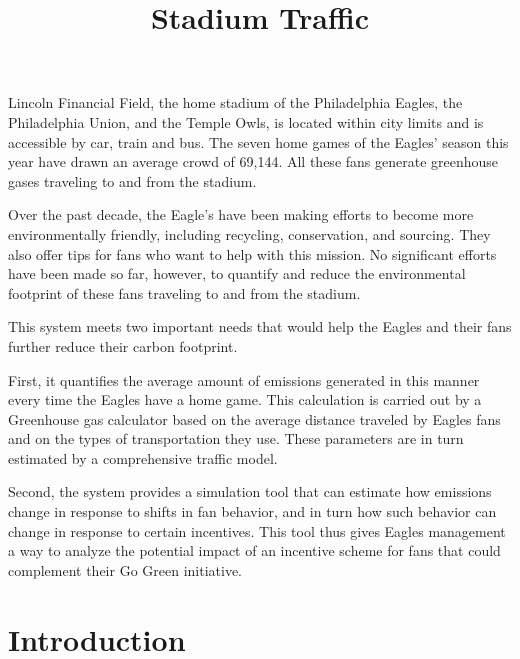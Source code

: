 \documentclass[12pt]{article}
\title{Stadium Traffic}
\begin{document}
\maketitle
\abstract

Lincoln Financial Field, the home stadium of the Philadelphia Eagles,
the Philadelphia Union, and the Temple Owls, is located within city
limits and is accessible by car, train and bus. The seven home games
of the Eagles' season this year have drawn an average crowd of
69,144. \cite{espn-attendance} All these fans generate greenhouse
gases traveling to and from the stadium.

Over the past decade, the Eagle's have been making efforts to become
more environmentally friendly, including recycling, conservation,
and sourcing. \cite{eagles-go-green}  They also offer tips for
fans who want to help with this mission. No significant efforts have
been made so far, however, to quantify and reduce the
environmental footprint of these fans traveling to and from the stadium.

This system meets two important needs that would help the Eagles and
their fans further reduce their carbon footprint.

First, it quantifies the average amount of emissions generated in this
manner every time the Eagles have a home game. This calculation is
carried out by a Greenhouse gas calculator based on the average
distance traveled by Eagles fans and on the types of transportation
they use. These parameters are in turn estimated by a comprehensive
traffic model.

Second, the system provides a simulation tool that can estimate how
emissions change in response to shifts in fan behavior, and in turn
how such behavior can change in response to certain incentives. This
tool thus gives Eagles management a way to analyze the potential
impact of an incentive scheme for fans that could complement their Go
Green initiative.

\newpage

\tableofcontents

\newpage

\mainmatter

\section{Introduction}
\end{document}
